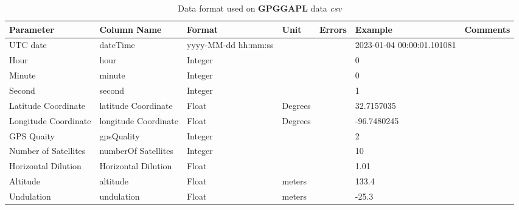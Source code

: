 \documentclass[12pt]{article}
\begin{document}
        \begin{table}[H]
        	\caption{Data format used on \textbf{GPGGAPL} data \emph{csv}}
        	 \label{t:dataFormatgpggapl}
        	\small
        	\begin{tabular}{||p{2cm}| p{2cm}|p{2cm}|p{1.5cm}|p{1.5cm}|p{2cm}|p{2cm}||}
        		\hline
        		\hline
        		Parameter & Column Name & Format & Unit & Errors&Example & Comments \\
                \hline
                \hline
        	UTC date & dateTime & yyyy-MM-dd hh:mm:ss & & & \tiny 2023-01-04 00:00:01.101081 &  \\
        	\hline
        	Hour & hour & Integer &   & & 0 & \\
                \hline
                Minute & minute & Integer &   & & 0 & \\
                \hline
                Second & second & Integer &   & & 1 & \\
                \hline
                Latitude \hbox{Coordinate} & latitude
                                     \hbox{Coordinate}  & Float & Degrees  & & 32.7157035 & \\
                \hline
                Longitude Coordinate& longitude
                                       \hbox{Coordinate}  & Float & Degrees & & -96.7480245 & \\
                \hline
                GPS Quaity & gpsQuality  & Integer & & & 2 & \\
                \hline
                Number of Satellites & numberOf
                                       Satellites  & Integer & & & 10 & \\
                \hline
                Horizontal Dilution & Horizontal
                                      Dilution  & Float & & & 1.01 & \\
                \hline
                Altitude & altitude  & Float & meters& & 133.4 & \\
                \hline
               Undulation & undulation  & Float &meters & & -25.3 & \\
                \hline
                \hline
        	\end{tabular}
        \end{table}
\clearpage
\end{document}
